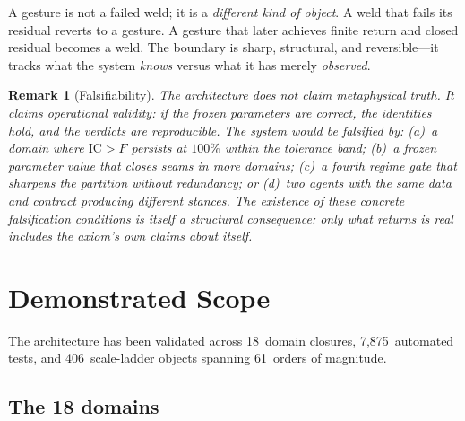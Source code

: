 \documentclass[
  aps,
  prd,
  twocolumn,
  superscriptaddress,
  nofootinbib,
  floatfix
]{revtex4-2}
\newtheorem{remark}{Remark}
\newcommand{\IC}{\mathrm{IC}}
\begin{document}
\noindent A gesture is not a failed weld; it is a
\emph{different kind of object}.  A weld that fails its residual
reverts to a gesture.  A gesture that later achieves finite return
and closed residual becomes a weld.  The boundary is sharp,
structural, and reversible---it tracks what the system \emph{knows}
versus what it has merely \emph{observed}.

\begin{remark}[Falsifiability]
The architecture does not claim metaphysical truth.  It claims
operational validity: if the frozen parameters are correct, the
identities hold, and the verdicts are reproducible.  The system
would be falsified by: (a)~a domain where $\IC > F$ persists at
$100\%$ within the tolerance band; (b)~a frozen parameter value
that closes seams in more domains; (c)~a fourth regime gate that
sharpens the partition without redundancy; or (d)~two agents with
the same data and contract producing different stances.  The
existence of these concrete falsification conditions is itself a
structural consequence: only what returns is real includes the
axiom's own claims about itself.
\end{remark}


\section{Demonstrated Scope}\label{sec:scope}

The architecture has been validated across 18~domain closures,
7{,}875~automated tests, and 406~scale-ladder objects spanning
61~orders of magnitude.

\subsection{The 18 domains}
\end{document}
